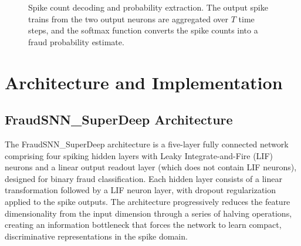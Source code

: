\begin{figure}[H]
\centering
{}
\caption{Spike count decoding and probability extraction. The output spike trains from the two output neurons are aggregated over $T$ time steps, and the softmax function converts the spike counts into a fraud probability estimate.}
\label{fig:snn-output-decoding-fig}
\end{figure}

\section{Architecture and Implementation}

\subsection{FraudSNN\_SuperDeep Architecture}

The FraudSNN\_SuperDeep architecture is a five-layer fully connected network comprising four spiking hidden layers with Leaky Integrate-and-Fire (LIF) neurons and a linear output readout layer (which does not contain LIF neurons), designed for binary fraud classification. Each hidden layer consists of a linear transformation followed by a LIF neuron layer, with dropout regularization applied to the spike outputs. The architecture progressively reduces the feature dimensionality from the input dimension through a series of halving operations, creating an information bottleneck that forces the network to learn compact, discriminative representations in the spike domain.

